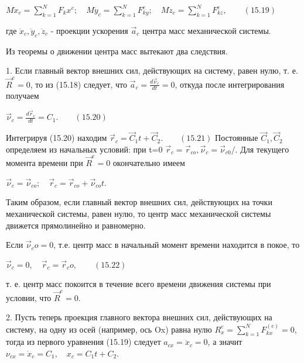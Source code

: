 {\begin{center}
\par $M \ddot x_c = \sum\limits_{k=1}^N F_kx^e; \quad M \ddot y_c = \sum\limits_{k=1}^N F_{ky}^e; \quad M \ddot z_c = \sum\limits_{k=1}^N F_{kz}^e, \qquad (15.19)$

\par где $\ddot x_c,\ddot y_c,\ddot z_c$ - проекции ускорения $\vec a_c$ центра масс механической системы.

\par Из теоремы о движении центра масс вытекают два следствия.

\par 1. Если главный вектор внешних сил, действующих на систему, равен нулю, т. е. $\vec R^e = 0$, то  из (15.18) следует, что $\vec a_c = \frac{d\vec\nu_c}{dt} = 0$, откуда после интегрирования получаем

\par $\vec\nu_c = \frac{d\vec r_c}{dt} = C_1. \qquad (15.20)$
\par Интегрируя (15.20) находим $\vec r_c = \vec C_1 t + \vec C_2. \qquad (15.21)$
Постоянные $\vec C_1, \vec C_2$ определяем из начальных условий: при t=0 $\vec r_c = \vec r_{co}, \vec\nu_c = \vec\nu_{c0}$/. Для текущего момента времени при $\vec R^e = 0$ окончательно имеем

\par $\vec\nu_c = \vec\nu_{co}; \quad \vec r_c = \vec r_{co} + \vec\nu_{co} t$.

\par Таким образом, если главный вектор внешних сил, действующих на точки механической системы, равен нулю, то центр масс механической системы движется прямолинейно и равномерно.

\par Если $\vec\nu_co = 0$, т.е. центр масс в начальный момент времени находится в покое, то

\par $\vec\nu_c = 0, \quad \vec r_c = \vec r_co, \qquad (15.22)$

\par т. е. центр масс покоится в течение всего времени движения системы при условии, что $\vec R^e = 0$.

\par 2. Пусть теперь проекция главного вектора внешних сил, действующих на систему, на одну из осей (например, ось Ox) равна нулю $R_x^e = \sum\limits_{k=1}^N F_{kx}^{(e)} = 0$, тогда из первого уравнения (15.19) следует $a_{cx} = \ddot x_c = 0$, а значит $\nu_{cx} = \dot x_c = C_1, \quad x_c = C_1 t + C_2$.


\end{center}}
